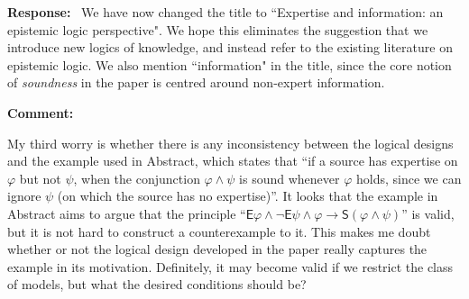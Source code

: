 \documentclass[12pt]{article}
\newenvironment{comment}{
    \noindent\textbf{Comment:}\
    \em
}{\vspace{5mm}}
\newenvironment{response}{
    \noindent\textbf{Response:}\
}{\vspace{5mm}}
\renewcommand{\phi}{\varphi}
\newcommand{\E}{\mathsf{E}}
\renewcommand{\S}{\mathsf{S}}
\begin{document}
\begin{response}
    We have now changed the title to ``Expertise and information: an epistemic
    logic perspective". We hope this eliminates the suggestion that we
    introduce new logics of knowledge, and instead refer to the existing
    literature on epistemic logic. We also mention ``information" in the
    title, since the core notion of \emph{soundness} in the paper is centred
    around non-expert information.
\end{response}

\begin{comment}
    My third worry is whether there is any inconsistency between the logical
    designs and the example used in Abstract, which states that ``if a source
    has expertise on $\phi$ but not $\psi$, when the conjunction $\phi \land
    \psi$ is sound whenever $\phi$ holds, since we can ignore $\psi$ (on which
    the source has no expertise)''. It looks that the example in Abstract aims
    to argue that the principle ``$\E\phi \land \neg\E\psi \land \phi
    \rightarrow \S(\phi \land \psi)$'' is valid, but it is not hard to
    construct a counterexample to it. This makes me doubt whether or not the
    logical design developed in the paper really captures the example in its
    motivation. Definitely, it may become valid if we restrict the class of
    models, but what the desired conditions should be?
\end{comment}
\end{document}
